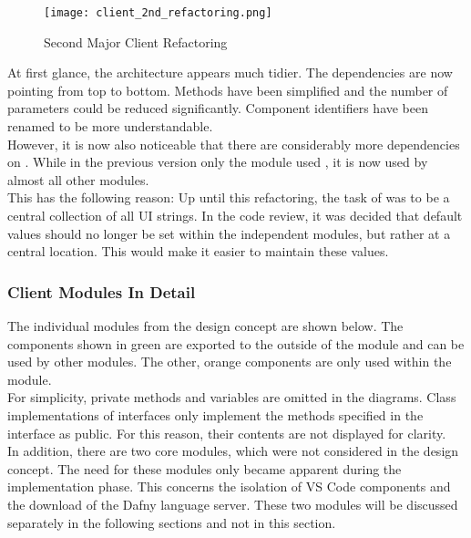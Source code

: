 \begin{figure}[H]
    \centering
    \texttt{[image: client\_2nd\_refactoring.png]}
    \caption{Second Major Client Refactoring}
    \label{fig:client_2nd_refactoring}
\end{figure}

At first glance, the architecture appears much tidier.
The dependencies are now pointing from top to bottom.
Methods have been simplified and the number of parameters could be reduced significantly.
Component identifiers have been renamed to be more understandable. \\

However, it is now also noticeable that there are considerably more dependencies on .
While in the previous version only the module  used , it is now used by almost all other modules.\\

This has the following reason: Up until this refactoring, the task of  was to be a central collection of all UI strings.  
In the code review, it was decided that default values should no longer be set within the independent modules,
but rather at a central location.
This would make it easier to maintain these values.

\subsubsection{Client Modules In Detail}
The individual modules from the design concept are shown below.
The components shown in green are exported to the outside of the module and can be used by other modules.
The other, orange components are only used within the module. \\

For simplicity,   private methods and variables are omitted in the diagrams.
Class implementations of interfaces only implement the methods specified in the interface as public.
For this reason, their contents are not displayed for clarity.  \\

In addition, there are two core modules, which were not considered in the design concept.
The need for these modules only became apparent during the implementation phase.
This concerns the isolation of VS Code components
and the download of the Dafny language server.
These two modules will be discussed separately in the following sections and not in this section.\\

